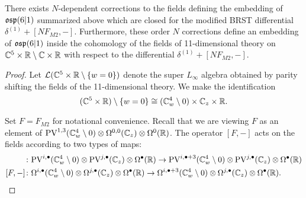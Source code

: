 \begin{prop}
\label{prop:brads4}
There exists $N$-dependent corrections to the fields defining the embedding of $\mathfrak{osp}(6|1)$ summarized above which are closed for the modified BRST differential $\delta^{(1)} + [N F_{M2},-]$. 
Furthermore, these order $N$ corrections define an embedding of $\mathfrak{osp}(6|1)$ inside the cohomology of the fields of 11-dimensional theory on $\mathbb C^5 \times \mathbb R \setminus \mathbb C \times \mathbb R$ with respect to the differential $\delta^{(1)} + [N F_{M2},-]$.
\end{prop}

\begin{proof}
Let $\mathcal L(\mathbb C^5 \times \mathbb R \setminus \{w=0\})$ denote the super $L_\infty$ algebra obtained by parity shifting the fields of the 11-dimensional theory. 
We make the identification 
\[
(\mathbb C^5 \times \mathbb R) \setminus \{w=0\} \cong (\mathbb C_w^4 \setminus 0) \times \mathbb C_z \times \mathbb R .
\]

Set $F = F_{M2}$ for notational convenience. Recall that we are viewing $F$ as an element of ${\rm PV}^{1,3}(\mathbb C_w^4 \setminus 0) \otimes \Omega^{0,0}(\mathbb C_z) \otimes \Omega^0(\mathbb R)$. 
The operator $[F,-]$ acts on the fields according to two types of maps:
\begin{align*}
[F ,-] & \colon \PV^{i,\bu}(\CC^4_w \setminus 0) \otimes \PV^{j,\bu} (\CC_z) \otimes \Omega^\bu (\RR) \to \PV^{i,\bu+3}(\CC^4_w \setminus 0) \otimes \PV^{j,\bu} (\CC_z) \otimes \Omega^\bu (\RR) \\
[F,-] & \colon \Omega^{i,\bu}(\CC^4_w \setminus 0) \otimes \Omega^{j,\bu} (\CC_z) \otimes \Omega^\bu (\RR) \to \Omega^{i,\bu+3}(\CC^4_w \setminus 0) \otimes \Omega^{j,\bu} (\CC_z) \otimes \Omega^\bu (\RR).
\end{align*}




\end{proof}
